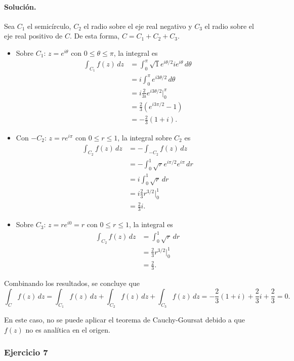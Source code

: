 \documentclass[a4paper]{report}
\begin{document}
\paragraph{Solución.} Sea \(C_1\) el semicírculo, \(C_2\) el radio sobre el eje real negativo y \(C_3\) el radio sobre el eje real positivo de \(C\). De esta forma, \(C=C_1+C_2+C_3\).
\begin{itemize}
 \item Sobre \(C_1:\,z=e^{i\theta}\) con \(0\leq\theta\leq\pi\), la integral es
 \begin{align*}
  \int_{C_1}f(z)\,dz&=\int_0^\pi\sqrt{1}e^{i\theta/2}ie^{i\theta}\,d\theta\\
   &=i\int_0^\pi e^{i3\theta/2}\,d\theta\\
   &=i \frac{2}{3i}e^{i3\theta/2}\bigg|_0^\pi\\
   &=\frac{2}{3}\left(e^{i3\pi/2}-1\right)\\
   &=-\frac{2}{3}(1+i).
 \end{align*}
 \item Con \(-C_2:\,z=re^{i\pi}\) con \(0\leq r\leq1\), la integral sobre \(C_2\) es
 \begin{align*}
  \int_{C_2}f(z)\,dz&=-\int_{-C_2}f(z)\,dz\\
   &=-\int_0^1\sqrt{r}e^{i\pi/2}e^{i\pi}\,dr\\
   &=i\int_0^1\sqrt{r}\,dr\\
   &=i\frac{2}{3}r^{3/2}\bigg|_0^1\\
   &=\frac{2}{3}i.
 \end{align*}
 \item Sobre \(C_3:\,z=re^{i0}=r\) con \(0\leq r\leq1\), la integral es
 \begin{align*}
  \int_{C_2}f(z)\,dz&=\int_0^1\sqrt{r}\,dr\\
   &=\frac{2}{3}r^{3/2}\bigg|_0^1\\
   &=\frac{2}{3}.
 \end{align*}
\end{itemize}
Combinando los resultados, se concluye que 
\[
 \int_{C}f(z)\,dz=\int_{C_1}f(z)\,dz+\int_{C_2}f(z)\,dz+\int_{C_3}f(z)\,dz=-\frac{2}{3}(1+i)+\frac{2}{3}i+\frac{2}{3}=0.
\]

En este caso, no se puede aplicar el teorema de Cauchy-Goursat debido a que \(f(z)\) no es analítica en el origen.

\subsubsection*{Ejercicio 7}
\end{document}
